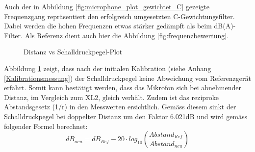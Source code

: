 \documentclass[12pt]{article}
\begin{document}
		\noindent Auch der in Abbildung \ref{fig:microphone_plot_gewichtet_C} gezeigte Frequenzgang repräsentiert den erfolgreich umgesetzten C-Gewichtungsfilter. Dabei werden die hohen Frequenzen etwas stärker gedämpft als beim dB(A)-Filter. Als Referenz dient auch hier die Abbildung \ref{fig:frequenzbewertung}.
		\begin{figure}[H]
		\centering
			\caption{Distanz vs Schalldruckpegel-Plot}
			\label{fig:microphone_plot_distanz}
		\end{figure}
	\noindent Abbildung \ref{fig:microphone_plot_distanz} zeigt, dass nach der initialen Kalibration (siehe Anhang \ref{Kalibrationsmessung}) der Schalldruckpegel keine Abweichung vom Referenzgerät erfährt. Somit kann bestätigt werden, dass das Mikrofon sich bei abnehmender Distanz, im Vergleich zum XL2, gleich verhält. Zudem ist das reziproke Abstandsgesetz (\color{green}1/r\color{black}) in den Messwerten ersichtlich. Gemäss diesem sinkt der Schalldruckpegel bei doppelter Distanz um den Faktor 6.021dB und wird gemäss folgender Formel berechnet:
	\begin{equation}\label{eq:Abstandsgesetz}
		dB_{neu} = dB_{Ref} - 20 \cdot log_{10}\left( \frac{Abstand_{Ref}}{Abstand_{neu}}\right) 
	\end{equation}
	
	\newpage
\end{document}
